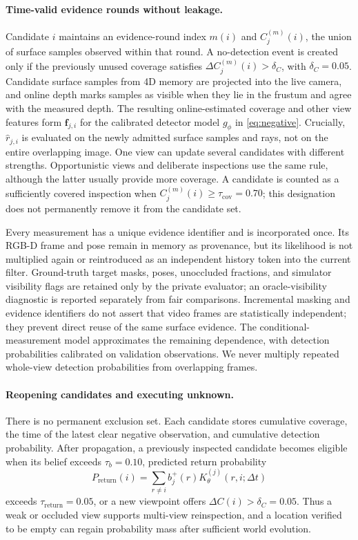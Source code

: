 \paragraph{Time-valid evidence rounds without leakage.}
Candidate $i$ maintains an evidence-round index $m(i)$ and
$C_j^{(m)}(i)$, the union of surface samples observed within that round. A
no-detection event is created only if the previously unused coverage satisfies
$\Delta C_j^{(m)}(i)>\delta_C$, with $\delta_C=0.05$. Candidate
surface samples from 4D memory are projected into the live camera, and online
depth marks samples as visible when they lie in the frustum and agree with the
measured depth. The resulting online-estimated coverage and other view features
form $\mathbf f_{j,i}$ for the calibrated detector model $g_\phi$ in
\cref{eq:negative}. Crucially, $\widehat r_{j,i}$ is evaluated on the newly
admitted surface samples and rays, not on the entire overlapping image. One
view can update several candidates with different strengths. Opportunistic
views and deliberate inspections use the same rule, although the latter usually
provide more coverage. A candidate is counted as a sufficiently covered
inspection when $C_j^{(m)}(i)\geq\tau_{\mathrm{cov}}=0.70$; this designation
does not permanently remove it from the candidate set.

Every measurement has a unique evidence identifier and is incorporated once.
Its RGB-D frame and pose remain in memory as provenance, but its likelihood is
not multiplied again or reintroduced as an independent history token into the
current filter. Ground-truth target masks, poses, unoccluded fractions, and
simulator visibility flags are retained only by the private evaluator; an
oracle-visibility diagnostic is reported separately from fair comparisons.
Incremental masking and evidence identifiers do not assert that video frames
are statistically independent; they prevent direct reuse of the same surface
evidence. The conditional-measurement model approximates the remaining dependence,
with detection probabilities calibrated on validation observations. We never
multiply repeated whole-view detection probabilities from overlapping frames.

\paragraph{Reopening candidates and executing unknown.}
There is no permanent exclusion set. Each candidate stores cumulative coverage,
the time of the latest clear negative observation, and cumulative detection probability.
After propagation, a previously inspected candidate becomes eligible when its
belief exceeds $\tau_b=0.10$, predicted return probability
\begin{equation}
P_{\mathrm{return}}(i)=\sum_{r\neq i}b_j^+(r)
K_\theta^{(j)}(r,i;\Delta t)
\label{eq:return-prob}
\end{equation}
exceeds $\tau_{\mathrm{return}}=0.05$, or a new viewpoint offers
$\Delta C(i)>\delta_C=0.05$. Thus a weak or occluded view supports multi-view
reinspection, and a location verified to be empty can regain probability mass after sufficient
world evolution.

